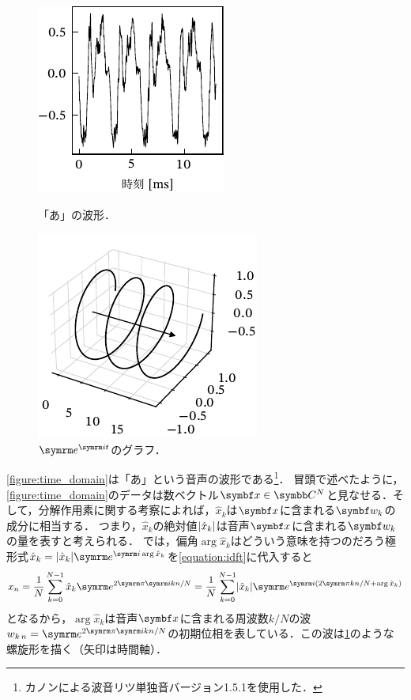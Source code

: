 \documentclass[../../main]{subfiles}
\begin{document}
\begin{figure}[htbp]
  \begin{minipage}{\linewidth/2}
    \centering
    \includegraphics{figures/time_domain.pdf}
    \caption{「あ」の波形．}
    \label{figure:time_domain}
  \end{minipage}%
  \begin{minipage}{\linewidth/2}
    \centering
    \includegraphics{figures/helix.pdf}
    \caption{\(\napr^{\iuni t}\)のグラフ．}
    \label{figure:complex_sinusoid}
  \end{minipage}
\end{figure}

\cref{figure:time_domain}は「あ」という音声の波形である\footnote{カノン\cite{canon}による波音リツ単独音バージョン1.5.1を使用した．}．
冒頭で述べたように，\cref{figure:time_domain}のデータは数ベクトル\(\vect{x}\in\numset{C}^N\)と見なせる．そして，分解作用素に関する考察によれば，\(\hat{x}_k\)は\(\vect{x}\)に含まれる\(\vect{w}_k\)の成分に相当する．
つまり，\(\hat{x}_k\)の絶対値\(\lvert\hat{x}_k\rvert\)は音声\(\vect{x}\)に含まれる\(\vect{w}_k\)の量を表すと考えられる．
では，偏角\(\arg\hat{x}_k\)はどういう意味を持つのだろう\？極形式\(\hat{x}_k=\abs{\hat{x}_k}\napr^{\iuni\arg\hat{x}_k}\)を\cref{equation:idft}に代入すると
\[
  x_n = \frac{1}{N}\sum_{k=0}^{N-1}\hat{x}_k\napr^{2\krez\iuni kn/N}
  = \frac{1}{N}\sum_{k=0}^{N-1}\abs{\hat{x}_k}\napr^{\iuni(2\krez kn/N+\arg\hat{x}_k)}
\]
となるから，\(\arg\hat{x}_k\)は音声\(\vect{x}\)に含まれる周波数\(k/N\)の波\(\midx{w}{k}{n}=\napr^{2\krez\iuni kn/N}\)の初期位相を表している．この波は\cref{figure:complex_sinusoid}のような螺旋形を描く（矢印は時間軸）．
\end{document}
